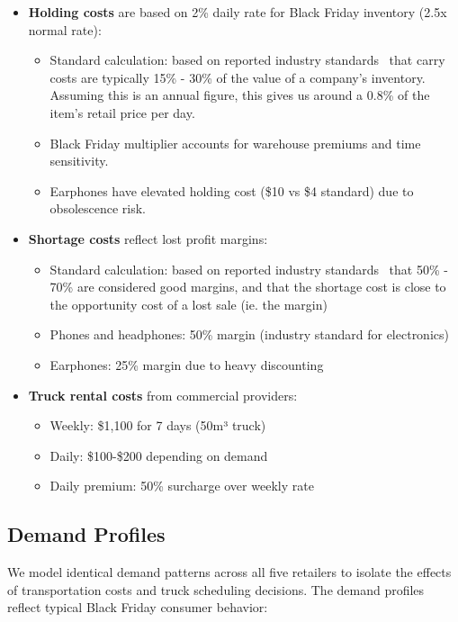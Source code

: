 \documentclass[a4paper,12pt]{article}
\begin{document}
\begin{itemize}
    \item \textbf{Holding costs} are based on 2\% daily rate for Black Friday inventory (2.5x normal rate):
    \begin{itemize}
        \item Standard calculation: based on reported industry standards~\cite{holdingcosts} that carry costs are typically 15\% - 30\% of the value of a company's inventory.
        Assuming this is an annual figure, this gives us around a 0.8\% of the item's retail price per day.
        \item Black Friday multiplier accounts for warehouse premiums and time sensitivity.
        \item Earphones have elevated holding cost (\$10 vs \$4 standard) due to obsolescence risk.
    \end{itemize}

    \item \textbf{Shortage costs} reflect lost profit margins:
    \begin{itemize}
        \item Standard calculation: based on reported industry standards~\cite{shortagecosts} that 50\% - 70\% are considered good margins, and that the shortage cost is close to the opportunity cost of a lost sale (ie. the margin)
        \item Phones and headphones: 50\% margin (industry standard for electronics)
        \item Earphones: 25\% margin due to heavy discounting
    \end{itemize}

    \item \textbf{Truck rental costs} from commercial providers:
    \begin{itemize}
        \item Weekly: \$1,100 for 7 days (50m³ truck)
        \item Daily: \$100-\$200 depending on demand
        \item Daily premium: 50\% surcharge over weekly rate
    \end{itemize}
\end{itemize}


\subsection{Demand Profiles}\label{subsec:demand-profiles}

We model identical demand patterns across all five retailers to isolate the effects of transportation costs and truck scheduling decisions. The demand profiles reflect typical Black Friday consumer behavior:
\end{document}
